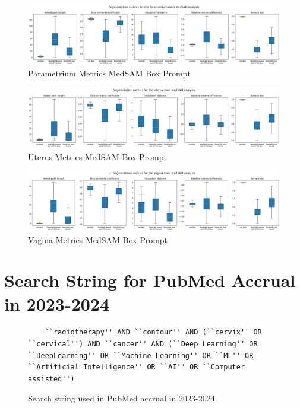 \documentclass[11pt,twoside]{report}
\begin{document}
\begin{landscape}
  \begin{figure}[H]
    \centering
    \includegraphics[width=\linewidth]{../../research/source/code/data/metrics/metricsparametrium_1_combinednotable_MedSAM_analysis.png}
    \caption{Parametrium Metrics MedSAM Box Prompt}\label{fig:medsam-metrics-parametrium}
  \end{figure}

  \begin{figure}[H]
    \centering
    \includegraphics[width=\linewidth]{../../research/source/code/data/metrics/metricsuterus_1_combinednotable_MedSAM_analysis.png}
    \caption{Uterus Metrics MedSAM Box Prompt}\label{fig:medsam-metrics-uterus}
  \end{figure}

  \begin{figure}[H]
    \centering
    \includegraphics[width=\linewidth]{../../research/source/code/data/metrics/metricsvagina_1_combinednotable_MedSAM_analysis.png}
    \caption{Vagina Metrics MedSAM Box Prompt}\label{fig:medsam-metrics-vagina}
  \end{figure}

\end{landscape}

\section{Search String for PubMed Accrual in 2023-2024}

\begin{figure}[H]
  \begin{lstlisting}
    ``radiotherapy'' AND ``contour'' AND (``cervix'' OR ``cervical'') AND ``cancer'' AND (``Deep Learning'' OR ``DeepLearning'' OR ``Machine Learning'' OR ``ML'' OR ``Artificial Intelligence'' OR ``AI'' OR ``Computer assisted'')  
   \end{lstlisting}
   \caption{Search string used in PubMed accrual in 2023-2024}\label{fig:pubmed-search-string}  
\end{figure}
\end{document}
